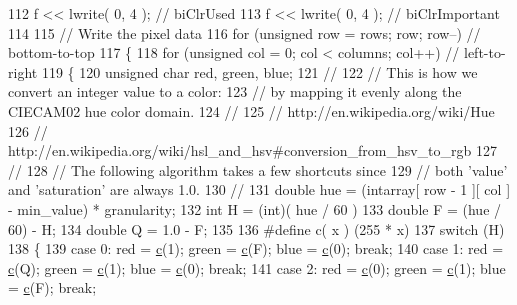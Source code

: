 \begin{DoxyCode}
112     f << lwrite( 0,                              4 );  \textcolor{comment}{// biClrUsed}
113     f << lwrite( 0,                              4 );  \textcolor{comment}{// biClrImportant}
114 
115     \textcolor{comment}{// Write the pixel data}
116     \textcolor{keywordflow}{for} (\textcolor{keywordtype}{unsigned} row = rows; row; row--)           \textcolor{comment}{// bottom-to-top}
117       \{
118       \textcolor{keywordflow}{for} (\textcolor{keywordtype}{unsigned} col = 0; col < columns; col++)  \textcolor{comment}{// left-to-right}
119         \{
120         \textcolor{keywordtype}{unsigned} \textcolor{keywordtype}{char} red, green, blue;
121         \textcolor{comment}{//}
122         \textcolor{comment}{// This is how we convert an integer value to a color:}
123         \textcolor{comment}{// by mapping it evenly along the CIECAM02 hue color domain.}
124         \textcolor{comment}{//}
125         \textcolor{comment}{// http://en.wikipedia.org/wiki/Hue}
126         \textcolor{comment}{// http://en.wikipedia.org/wiki/hsl\_and\_hsv#conversion\_from\_hsv\_to\_rgb}
127         \textcolor{comment}{//}
128         \textcolor{comment}{// The following algorithm takes a few shortcuts since}
129         \textcolor{comment}{// both 'value' and 'saturation' are always 1.0.}
130         \textcolor{comment}{//}
131         \textcolor{keywordtype}{double} hue = (intarray[ row - 1 ][ col ] - min\_value) * granularity;
132         \textcolor{keywordtype}{int}    H = (int)( hue / 60 ) %
133         \textcolor{keywordtype}{double} F = (hue / 60) - H;
134         \textcolor{keywordtype}{double} Q = 1.0 - F;
135 
136 \textcolor{preprocessor}{        #define c( x ) (255 * x)}
137         \textcolor{keywordflow}{switch} (H)
138           \{
139           \textcolor{keywordflow}{case} 0:  red = \hyperlink{IntArray2bmp_8h_ae9d8014c37dbf37873bdee6b8497a065}{c}(1);  green = \hyperlink{IntArray2bmp_8h_ae9d8014c37dbf37873bdee6b8497a065}{c}(F);  blue = \hyperlink{IntArray2bmp_8h_ae9d8014c37dbf37873bdee6b8497a065}{c}(0);  \textcolor{keywordflow}{break};
140           \textcolor{keywordflow}{case} 1:  red = \hyperlink{IntArray2bmp_8h_ae9d8014c37dbf37873bdee6b8497a065}{c}(Q);  green = \hyperlink{IntArray2bmp_8h_ae9d8014c37dbf37873bdee6b8497a065}{c}(1);  blue = \hyperlink{IntArray2bmp_8h_ae9d8014c37dbf37873bdee6b8497a065}{c}(0);  \textcolor{keywordflow}{break};
141           \textcolor{keywordflow}{case} 2:  red = \hyperlink{IntArray2bmp_8h_ae9d8014c37dbf37873bdee6b8497a065}{c}(0);  green = \hyperlink{IntArray2bmp_8h_ae9d8014c37dbf37873bdee6b8497a065}{c}(1);  blue = \hyperlink{IntArray2bmp_8h_ae9d8014c37dbf37873bdee6b8497a065}{c}(F);  \textcolor{keywordflow}{break};

\end{DoxyCode}
